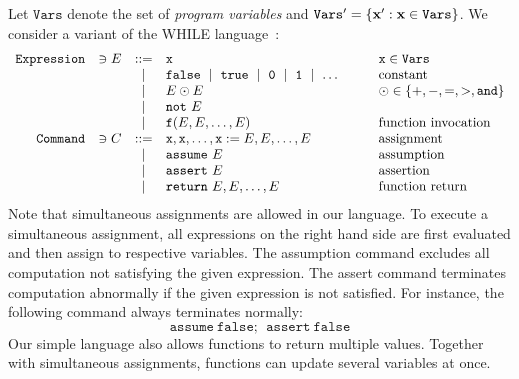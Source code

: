 
Let $\mathtt{Vars}$ denote the set of \emph{program variables} and
$\mathtt{Vars}' = \{ \textbf{x}' : \textbf{x} \in \mathtt{Vars} \}$.
We consider a variant of the WHILE language~\cite{}:
\begin{equation*}
  \begin{array}{rccll}
    \mathtt{Expression} & \ni E & ::= &
    \mathtt{x} & \mathtt{x} \in \mathtt{Vars}\\
    & & \mid &
    \mathtt{false}\ \mid\ \mathtt{true}\ \mid\ 
    \mathtt{0}\ \mid\ \mathtt{1}\ \mid\ \ldots\hspace{.06\textwidth} &
    \textmd{constant}\\
    & & \mid &
    E \odot E  & \odot \in \{ +, -, =, >, \mathtt{and} \}\\
    & & \mid & \mathtt{not}\ E\\
    & & \mid &
    \mathtt{f}(E, E, \ldots, E) &
    \textmd{function invocation}\\
    \mathtt{Command} & \ni C & ::= &
    \mathtt{x}, \mathtt{x}, \ldots, \mathtt{x} := 
    E, E, \ldots, E & \textmd{assignment}\\
    & & \mid &
    \mathtt{assume}\ E & \textmd{assumption}\\
    & & \mid &
    \mathtt{assert}\ E & \textmd{assertion}\\
    & & \mid &
    \mathtt{return}\ E, E, \ldots, E & \textmd{function return}\\
  \end{array}
\end{equation*}
Note that simultaneous assignments are allowed in our language. To
execute a simultaneous assignment, all expressions on the right hand
side are first evaluated and then assign to respective variables. The
assumption command excludes all computation not satisfying the given
expression. The assert command terminates computation
abnormally if the given expression is not satisfied. For
instance, the following command always terminates normally:
\begin{equation*}
  \mathtt{assume\ false};\ \ \mathtt{assert\ false}
\end{equation*}
Our simple language also allows functions to return multiple
values. Together with simultaneous assignments, functions can update
several variables at once.

